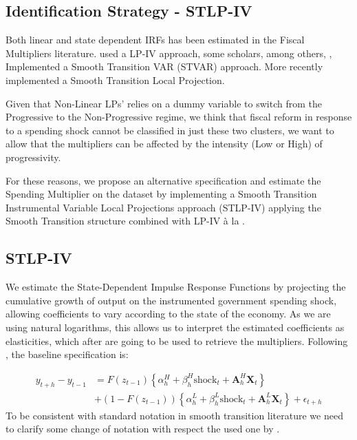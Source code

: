 \documentclass[12pt,letterpaper]{article}
\begin{document}
\subsection{Identification Strategy - STLP-IV}
Both linear and state dependent IRFs has been estimated in the Fiscal Multipliers literature.
\cite{RameyZubairy2018} used a LP-IV approach, 
some scholars, among others, \cite{Auerbach_Gorodn_2012_FiscalMultil,Auerbach_Gorodnichenko_2012_Measuring, CaggianoCastelnuovo_NonLinear}, Implemented a Smooth Transition VAR (STVAR) approach. More recently \cite{Ascari} implemented a Smooth Transition Local Projection.

Given that \cite{FN} Non-Linear LPs' relies on a dummy variable to switch from the Progressive to the Non-Progressive regime, we think that fiscal reform in response to a spending shock cannot be classified in just these two clusters, we want to allow that the multipliers can be affected by the intensity (Low or High) of progressivity.

For these reasons, we propose an alternative specification and 
estimate the Spending Multiplier on the \cite{FN} dataset by implementing a Smooth Transition Instrumental Variable Local Projections approach (STLP-IV) applying the \cite{GrangerTerasvirtaAnderson1993} Smooth Transition structure combined with LP-IV à la \cite{Jordà2005, JordàTaylo2025LP-IV}.

\subsection{STLP-IV}
We estimate the State-Dependent Impulse Response Functions by projecting the cumulative growth of output on the instrumented government spending shock, allowing coefficients to vary according to the state of the economy. As we are using natural logarithms, this allows us to interpret the estimated coefficients as elasticities, which after are going to be used to retrieve the multipliers.
Following \cite{Ascari}, the baseline specification is:

\begin{align}
    y_{t+h} - y_{t-1} & = F(z_{t-1}) \left\{ \alpha^{H}_{h} + \beta^{H}_{h} \text{shock}_t + \bm{A}^{H}_{h} \bm{X}_t \right\} \nonumber \\
    & + (1 - F(z_{t-1})) \left\{ \alpha^{L}_{h} + \beta^{L}_{h} \text{shock}_t + \bm{A}^{L}_{h} \bm{X}_t \right\} + \epsilon_{t+h}
    \label{eq:STLP-IV_BasicModel}
\end{align}
To be consistent with standard notation in smooth transition literature we need to clarify some change of notation with respect the used one by \cite{FN}.
\end{document}
